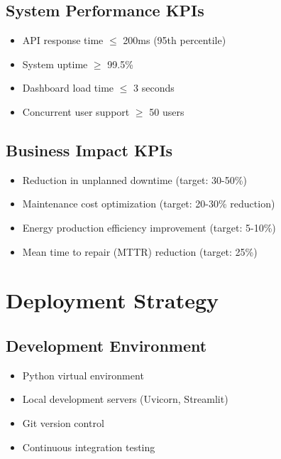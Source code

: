 \documentclass[12pt,a4paper]{article}
\begin{document}
\subsection{System Performance KPIs}

\begin{itemize}[leftmargin=*]
    \item API response time $\leq$ 200ms (95th percentile)
    \item System uptime $\geq$ 99.5\%
    \item Dashboard load time $\leq$ 3 seconds
    \item Concurrent user support $\geq$ 50 users
\end{itemize}

\subsection{Business Impact KPIs}

\begin{itemize}[leftmargin=*]
    \item Reduction in unplanned downtime (target: 30-50\%)
    \item Maintenance cost optimization (target: 20-30\% reduction)
    \item Energy production efficiency improvement (target: 5-10\%)
    \item Mean time to repair (MTTR) reduction (target: 25\%)
\end{itemize}

\newpage

\section{Deployment Strategy}

\subsection{Development Environment}
\begin{itemize}[leftmargin=*]
    \item Python virtual environment
    \item Local development servers (Uvicorn, Streamlit)
    \item Git version control
    \item Continuous integration testing
\end{itemize}
\end{document}
